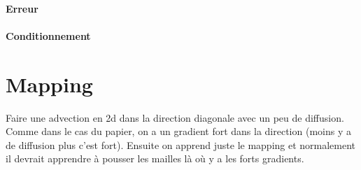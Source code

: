 \documentclass[12pt,a4paper]{article}
\let\oldparagraph\paragraph
\renewcommand{\paragraph}[1]{\oldparagraph{#1}\leavevmode}
\begin{document}
\paragraph{Erreur}

\paragraph{Conditionnement}




\newpage
\section{Mapping}

Faire une advection en 2d dans la direction diagonale avec un peu de diffusion.
Comme dans le cas du papier, on a un gradient fort dans la direction (moins y a de diffusion plus c'est fort).
Ensuite on apprend juste le mapping et normalement il devrait apprendre à pousser les mailles là où y a les forts gradients.

\newpage



\end{document}
